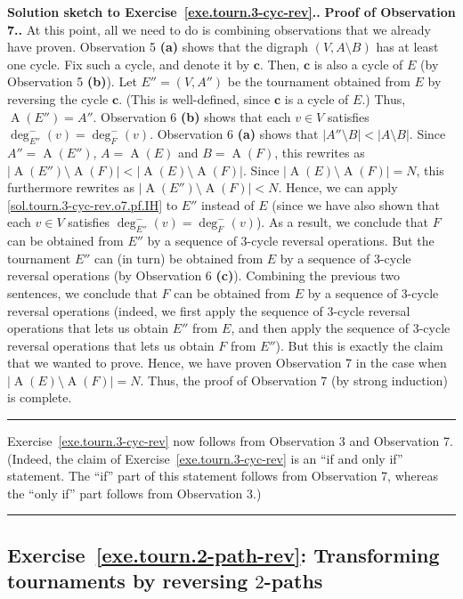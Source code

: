 \documentclass[numbers=enddot,12pt,final,onecolumn,notitlepage]{scrartcl}%
\theoremstyle{definition}
\newenvironment{proof}[1][Proof]{\noindent\textbf{#1.} }{\ \rule{0.5em}{0.5em}}
\newcommand{\abs}[1]{\left| #1 \right|}
\newcommand{\tup}[1]{\left( #1 \right)}
\newcommand{\arcs}[1]{\operatorname{A}\left( #1 \right)}
\begin{document}
\begin{proof}[Solution sketch to Exercise~\ref{exe.tourn.3-cyc-rev}.]
\begin{proof}[Proof of Observation 7.]
At this point, all we need to do is combining observations that
we already have proven. Observation 5 \textbf{(a)} shows that
the digraph $\tup{V, A \setminus B}$ has at least one
cycle. Fix such a cycle, and denote it by $\mathbf{c}$. Then,
$\mathbf{c}$ is also a cycle of $E$ (by Observation 5 \textbf{(b)}).
Let $E'' = \tup{V, A''}$ be the tournament obtained from $E$ by
reversing the cycle $\mathbf{c}$. (This is well-defined,
since $\mathbf{c}$ is a cycle of $E$.) Thus,
$\arcs{E''} = A''$. Observation 6 \textbf{(b)}
shows that each $v \in V$ satisfies
$\deg^-_{E''} \tup{v} = \deg^-_F \tup{v}$.
Observation 6 \textbf{(a)} shows that
$\abs{A'' \setminus B} < \abs{A \setminus B}$.
Since $A'' = \arcs{E''}$, $A = \arcs{E}$ and $B = \arcs{F}$,
this rewrites as
$\abs{\arcs{E''} \setminus \arcs{F}}
< \abs{\arcs{E} \setminus \arcs{F}}$.
Since $\abs{\arcs{E} \setminus \arcs{F}} = N$, this furthermore
rewrites as
$\abs{\arcs{E''} \setminus \arcs{F}} < N$. Hence, we can apply
\eqref{sol.tourn.3-cyc-rev.o7.pf.IH} to $E''$ instead of $E$ (since
we have also shown that each $v \in V$ satisfies
$\deg^-_{E''} \tup{v} = \deg^-_F \tup{v}$). As a result, we conclude
that $F$ can be obtained from $E''$ by a sequence of
$3$-cycle reversal operations. But the tournament $E''$ can (in
turn) be obtained from $E$ by a sequence of $3$-cycle reversal
operations (by Observation 6 \textbf{(c)}). Combining the previous
two sentences, we conclude that $F$ can be obtained from $E$ by
a sequence of $3$-cycle reversal operations (indeed, we first apply
the sequence of $3$-cycle reversal operations that lets us obtain
$E''$ from $E$, and then apply
the sequence of $3$-cycle reversal operations that lets us obtain
$F$ from $E''$). But this is exactly the claim that we wanted to
prove. Hence, we have proven Observation 7 in the case when
$\abs{\arcs{E} \setminus \arcs{F}} = N$.
Thus, the proof of Observation 7 (by strong induction) is complete.
\end{proof}

Exercise~\ref{exe.tourn.3-cyc-rev} now follows from Observation 3
and Observation 7. (Indeed, the claim of
Exercise~\ref{exe.tourn.3-cyc-rev} is an ``if and only if''
statement. The ``if'' part of this statement follows from
Observation 7, whereas the ``only if'' part follows from
Observation 3.)
\end{proof}

\subsection{Exercise~\ref{exe.tourn.2-path-rev}: Transforming
tournaments by reversing $2$-paths}
\end{document}
